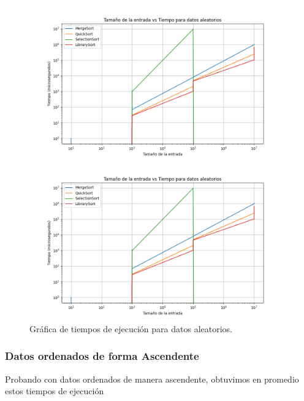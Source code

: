 \begin{figure}[H]
    \centering
      \begin{minipage}[t]{0.5\textwidth}
          \includegraphics[width=\textwidth]{../code/sorting/data/plots/aleatorio_plot.png}
      \end{minipage}%
      \begin{minipage}[t]{0.5\textwidth}
          \includegraphics[width=\textwidth]{../code/sorting/data/plots/aleatorio_plot.png}
       \end{minipage}%
      \caption{Gráfica de tiempos de ejecución para datos aleatorios.}
      \label{fig:sorting-aleatorio}
\end{figure}

\subsubsection*{Datos ordenados de forma Ascendente}
Probando con datos ordenados de manera ascendente,  obtuvimos en promedio estos tiempos de ejecución

